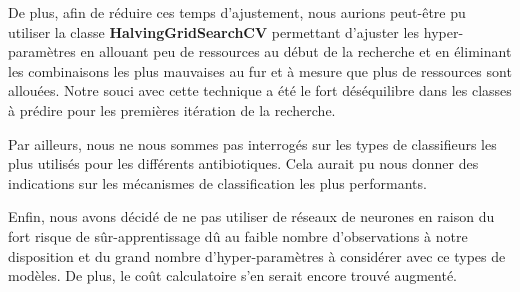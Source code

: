 \documentclass[11pt]{article}
\begin{document}
  De plus, afin de réduire ces temps d'ajustement, nous aurions peut-être pu utiliser la classe \textbf{HalvingGridSearchCV} permettant d'ajuster les hyper-paramètres en allouant peu de ressources au début de la recherche et en éliminant les combinaisons les plus mauvaises au fur et à mesure que plus de ressources sont allouées.
  Notre souci avec cette technique a été le fort déséquilibre dans les classes à prédire pour les premières itération de la recherche.

  Par ailleurs, nous ne nous sommes pas interrogés sur les types de classifieurs les plus utilisés pour les différents antibiotiques.
  Cela aurait pu nous donner des indications sur les mécanismes de classification les plus performants.

  Enfin, nous avons décidé de ne pas utiliser de réseaux de neurones en raison du fort risque de sûr-apprentissage dû au faible nombre d'observations à notre disposition et du grand nombre d'hyper-paramètres à considérer avec ce types de modèles.
  De plus, le coût calculatoire s'en serait encore trouvé augmenté.
\end{document}
